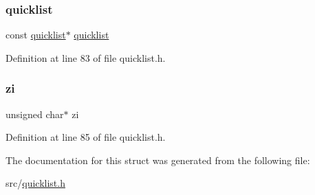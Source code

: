 \mbox{\label{structquicklist_iter_a4aa33c2ba0681808fcf026725cfac512}} 
\subsubsection{\texorpdfstring{quicklist}{quicklist}}
{\footnotesize\ttfamily const \hyperlink{structquicklist}{quicklist}$\ast$ \hyperlink{structquicklist}{quicklist}}



Definition at line 83 of file quicklist.\+h.

\mbox{\label{structquicklist_iter_a14218c4c1ee05ec32cc12721f772f294}} 
\subsubsection{\texorpdfstring{zi}{zi}}
{\footnotesize\ttfamily unsigned char$\ast$ zi}



Definition at line 85 of file quicklist.\+h.



The documentation for this struct was generated from the following file\+:\begin{DoxyCompactItemize}
\item 
src/\hyperlink{quicklist_8h}{quicklist.\+h}\end{DoxyCompactItemize}
